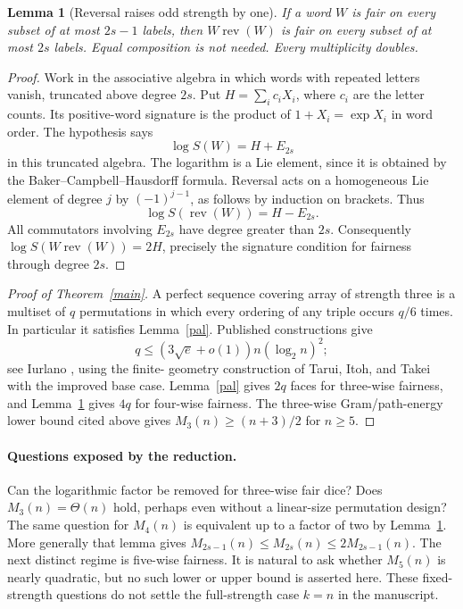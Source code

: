 \documentclass[11pt]{article}
\newtheorem{lemma}[theorem]{Lemma}
\begin{document}
\begin{lemma}[Reversal raises odd strength by one]\label{reverse}
If a word $W$ is fair on every subset of at most $2s-1$ labels, then
$W\operatorname{rev}(W)$ is fair on every subset of at most $2s$ labels.
Equal composition is not needed. Every multiplicity doubles.
\end{lemma}
\begin{proof}
Work in the associative algebra in which words with repeated letters
vanish, truncated above degree $2s$. Put $H=\sum_i c_iX_i$, where $c_i$
are the letter counts. Its positive-word signature is the product of
$1+X_i=\exp X_i$ in word order. The hypothesis says
\[
 \log S(W)=H+E_{2s}
\]
in this truncated algebra. The logarithm is a Lie element, since it is
obtained by the Baker--Campbell--Hausdorff formula.
Reversal acts on a homogeneous Lie element of degree $j$ by
$(-1)^{j-1}$, as follows by induction on brackets. Thus
\[
 \log S(\operatorname{rev}(W))=H-E_{2s}.
\]
All commutators involving $E_{2s}$ have degree greater than $2s$.
Consequently $\log S(W\operatorname{rev}(W))=2H$, precisely the
signature condition for fairness through degree $2s$.
\end{proof}

\begin{proof}[Proof of Theorem~\ref{main}]
A perfect sequence covering array of strength three is a multiset of
$q$ permutations in which every ordering of any triple occurs $q/6$
times. In particular it satisfies Lemma~\ref{pal}. Published
constructions give
\[
 q\le(3\sqrt e+o(1))n(\log_2n)^2;
\]
see Iurlano \cite[Remark 5, equation (11)]{iurlano}, using the finite-
geometry construction of Tarui, Itoh, and Takei with the improved base
case. Lemma~\ref{pal} gives $2q$ faces for three-wise fairness, and
Lemma~\ref{reverse} gives $4q$ for four-wise fairness.
The three-wise Gram/path-energy lower bound cited above gives
$M_3(n)\ge(n+3)/2$ for $n\ge5$.
\end{proof}

\paragraph{Questions exposed by the reduction.}
Can the logarithmic factor be removed for three-wise fair dice?
Does $M_3(n)=\Theta(n)$ hold, perhaps even without a linear-size
permutation design? The same question for $M_4(n)$ is equivalent up to
a factor of two by Lemma~\ref{reverse}. More generally that lemma gives
$M_{2s-1}(n)\le M_{2s}(n)\le2M_{2s-1}(n)$.
The next distinct regime is five-wise fairness. It is natural to ask
whether $M_5(n)$ is nearly quadratic, but no such lower or upper bound
is asserted here. These fixed-strength questions do not settle the
full-strength case $k=n$ in the manuscript.
\end{document}

